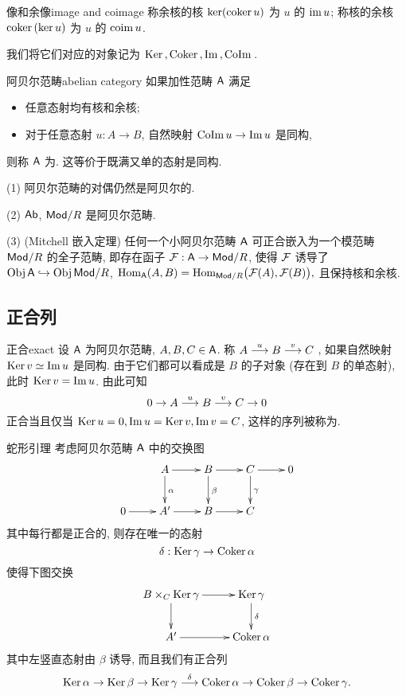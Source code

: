 \begin{definition}{像和余像}{image and coimage}
称余核的核 $\ker({\mathrm{coker}\,} u)$ 为 $u$ 的 ${\mathrm{im}\,} u$;
称核的余核 ${\mathrm{coker}\,}(\ker u)$ 为 $u$ 的 ${\mathrm{coim}\,} u$.
\end{definition}

我们将它们对应的对象记为 ${\mathrm{Ker}\,},{\mathrm{Coker}\,},{\mathrm{Im}\,},{\mathrm{CoIm}\,}$.

\begin{definition}{阿贝尔范畴}{abelian category}
如果加性范畴 ${\mathsf{A}}$ 满足
\begin{itemize}
\item 任意态射均有核和余核;
\item 对于任意态射 $u:A\to B$, 自然映射 ${\mathrm{CoIm}\,} u\to {\mathrm{Im}\,} u$ 是同构,
\end{itemize}
则称 ${\mathsf{A}}$ 为. 这等价于既满又单的态射是同构.
\end{definition}

\begin{example}
(1) 阿贝尔范畴的对偶仍然是阿贝尔的.

(2) ${\mathsf{Ab}}$, ${\mathsf{Mod}}/R$ 是阿贝尔范畴.

(3) (Mitchell 嵌入定理) 任何一个小阿贝尔范畴 ${\mathsf{A}}$ 可正合嵌入为一个模范畴 ${\mathsf{Mod}}/R$ 的全子范畴, 即存在函子 ${\mathcal{F}}:{\mathsf{A}}\to {\mathsf{Mod}}/R$, 使得 ${\mathcal{F}}$ 诱导了 ${\mathrm{Obj}\,} {\mathsf{A}}\hookrightarrow {\mathrm{Obj}\,}{\mathsf{Mod}}/R$, ${\mathrm{Hom}}_{\mathsf{A}}(A,B)={\mathrm{Hom}}_{{\mathsf{Mod}}/R}\bigl({\mathcal{F}}(A),{\mathcal{F}}(B)\bigr),$ 且保持核和余核.
\end{example}

\subsection{正合列}\label{subsec:exact_sequence}

\begin{definition}{正合}{exact}
设 ${\mathsf{A}}$ 为阿贝尔范畴, $A,B,C\in {\mathsf{A}}$. 称 $A\stackrel{u}{\longrightarrow} B\stackrel{v}{\longrightarrow} C$ , 如果自然映射 ${\mathrm{Ker}\,} v\simeq {\mathrm{Im}\,} u$ 是同构. 由于它们都可以看成是 $B$ 的子对象 (存在到 $B$ 的单态射), 此时 ${\mathrm{Ker}\,} v={\mathrm{Im}\,} u$.
由此可知
  \[0\rightarrow A \stackrel{u}{\longrightarrow}B\stackrel{v}{\longrightarrow}C\rightarrow 0\]
正合当且仅当 ${\mathrm{Ker}\,} u=0, {\mathrm{Im}\,} u={\mathrm{Ker}\,} v,{\mathrm{Im}\,} v=C$, 这样的序列被称为.
\end{definition}

\begin{proposition}{蛇形引理}{}
考虑阿贝尔范畴 ${\mathsf{A}}$ 中的交换图
  \[\xymatrix{
    &A\ar[r]\ar[d]^{\alpha}&B\ar[r]\ar[d]^\beta&C\ar[r]\ar[d]^\gamma&0\\
    0\ar[r]&A'\ar[r]&B\ar[r]&C
  }\]
其中每行都是正合的, 则存在唯一的态射
  \[\delta:{\mathrm{Ker}\,} \gamma\to {\mathrm{Coker}\,}\alpha\]
使得下图交换
  \[\xymatrix{
    B\times_C\Ker\gamma\ar[r]\ar[d]&\Ker \gamma\ar[d]^\delta\\
    A'\ar[r]&\Coker \alpha
  }\]
其中左竖直态射由 $\beta$ 诱导, 而且我们有正合列
  \[{\mathrm{Ker}\,}\alpha\to{\mathrm{Ker}\,}\beta\to{\mathrm{Ker}\,}\gamma\stackrel{\delta}{\longrightarrow}{\mathrm{Coker}\,}\alpha\to{\mathrm{Coker}\,}\beta\to{\mathrm{Coker}\,}\gamma.\]
\end{proposition}

